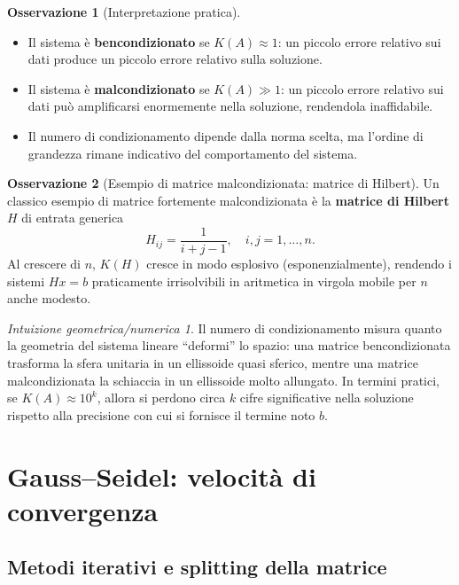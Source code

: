 \documentclass[a4paper,12pt]{article}
\theoremstyle{definition}
\newtheorem{osservazione}{Osservazione}[section]
\theoremstyle{remark}
\newtheorem*{intuizione}{Intuizione geometrica/numerica}
\begin{document}
\begin{osservazione}[Interpretazione pratica]
\leavevmode
\begin{itemize}
  \item Il sistema è \textbf{bencondizionato} se $K(A) \approx 1$:
        un piccolo errore relativo sui dati produce un piccolo errore
        relativo sulla soluzione.
  \item Il sistema è \textbf{malcondizionato} se $K(A) \gg 1$:
        un piccolo errore relativo sui dati può amplificarsi enormemente
        nella soluzione, rendendola inaffidabile.
  \item Il numero di condizionamento dipende dalla norma scelta,
        ma l'ordine di grandezza rimane indicativo del comportamento
        del sistema.
\end{itemize}
\end{osservazione}

\begin{osservazione}[Esempio di matrice malcondizionata: matrice di Hilbert]
Un classico esempio di matrice fortemente malcondizionata è la
\textbf{matrice di Hilbert} $H$ di entrata generica
\[
  H_{ij} = \frac{1}{i+j-1}, \quad i,j = 1,\ldots,n.
\]
Al crescere di $n$, $K(H)$ cresce in modo esplosivo (esponenzialmente),
rendendo i sistemi $Hx = b$ praticamente irrisolvibili in aritmetica
in virgola mobile per $n$ anche modesto.
\end{osservazione}

\begin{intuizione}
Il numero di condizionamento misura quanto la geometria del sistema lineare
``deformi'' lo spazio: una matrice bencondizionata trasforma la sfera
unitaria in un ellissoide quasi sferico, mentre una matrice malcondizionata
la schiaccia in un ellissoide molto allungato.
In termini pratici, se $K(A) \approx 10^k$, allora si perdono circa $k$
cifre significative nella soluzione rispetto alla precisione con cui si
fornisce il termine noto $b$.
\end{intuizione}

\section{Gauss--Seidel: velocità di convergenza}

\subsection{Metodi iterativi e splitting della matrice}
\end{document}
